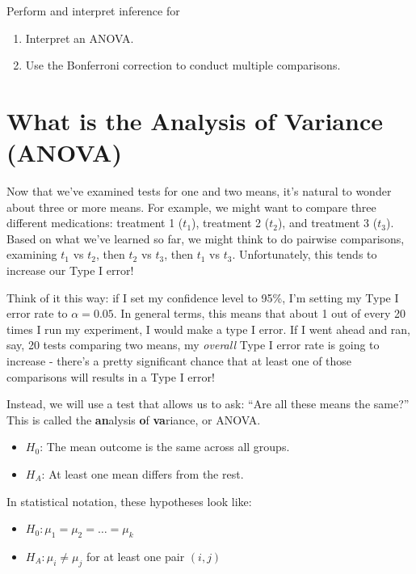 \documentclass[
]{book}
\providecommand{\tightlist}{%
  \setlength{\itemsep}{0pt}\setlength{\parskip}{0pt}}
\begin{document}
Perform and interpret inference for

\begin{enumerate}
\def\labelenumi{\arabic{enumi}.}
\tightlist
\item
  Interpret an ANOVA.
\item
  Use the Bonferroni correction to conduct multiple comparisons.
\end{enumerate}

\section{What is the Analysis of Variance (ANOVA)}\label{what-is-the-analysis-of-variance-anova}

Now that we've examined tests for one and two means, it's natural to wonder about three or more means. For example, we might want to compare three different medications: treatment 1 (\(t_1\)), treatment 2 (\(t_2\)), and treatment 3 (\(t_3\)). Based on what we've learned so far, we might think to do pairwise comparisons, examining \(t_1\) vs \(t_2\), then \(t_2\) vs \(t_3\), then \(t_1\) vs \(t_3\). Unfortunately, this tends to increase our Type I error!

Think of it this way: if I set my confidence level to 95\%, I'm setting my Type I error rate to \(\alpha=0.05\). In general terms, this means that about 1 out of every 20 times I run my experiment, I would make a type I error. If I went ahead and ran, say, 20 tests comparing two means, my \emph{overall} Type I error rate is going to increase - there's a pretty significant chance that at least one of those comparisons will results in a Type I error!

Instead, we will use a test that allows us to ask: ``Are all these means the same?'' This is called the \textbf{an}alysis \textbf{o}f \textbf{va}riance, or ANOVA.

\begin{itemize}
\tightlist
\item
  \(H_0\): The mean outcome is the same across all groups.
\item
  \(H_A\): At least one mean differs from the rest.
\end{itemize}

In statistical notation, these hypotheses look like:

\begin{itemize}
\tightlist
\item
  \(H_0: \mu_1 = \mu_2 = \dots = \mu_k\)
\item
  \(H_A: \mu_i \ne \mu_j\) for at least one pair \((i, j)\)
\end{itemize}
\end{document}
